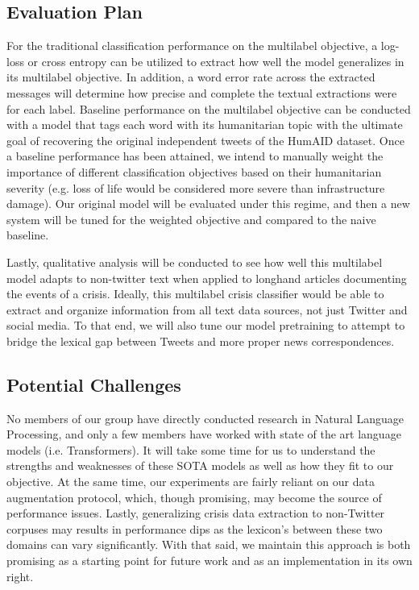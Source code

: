 \documentclass[11pt,a4paper]{article}
\begin{document}
\subsection{Evaluation Plan}
For the traditional classification performance on the multilabel objective, a log-loss or cross entropy can be utilized to extract how well the model generalizes in its multilabel objective. In addition, a word error rate across the extracted messages will determine how precise and complete the textual extractions were for each label. Baseline performance on the multilabel objective can be conducted with a model that tags each word with its humanitarian topic with the ultimate goal of recovering the original independent tweets of the HumAID dataset. Once a baseline performance has been attained, we intend to manually weight the importance of different classification objectives based on their humanitarian severity (e.g. loss of life would be considered more severe than infrastructure damage). Our original model will be evaluated under this regime, and then a new system will be tuned for the weighted objective and compared to the naive baseline.

Lastly, qualitative analysis will be conducted to see how well this multilabel model adapts to non-twitter text when applied to longhand articles documenting the events of a crisis. Ideally, this multilabel crisis classifier would be able to extract and organize information from all text data sources, not just Twitter and social media. To that end, we will also tune our model pretraining to attempt to bridge the lexical gap between Tweets and more proper news correspondences.

\subsection{Potential Challenges}%
\label{sub:potential_challenges}

No members of our group have directly conducted research in Natural Language Processing, and only a few members have worked with state of the art language models (i.e. Transformers). It will take some time for us to understand the strengths and weaknesses of these SOTA models as well as how they fit to our objective. At the same time, our experiments are fairly reliant on our data augmentation protocol, which, though promising, may become the source of performance issues. Lastly, generalizing crisis data extraction to non-Twitter corpuses may results in performance dips as the lexicon's between these two domains can vary significantly. With that said, we maintain this approach is both promising as a starting point for future work and as an implementation in its own right. 
\end{document}
